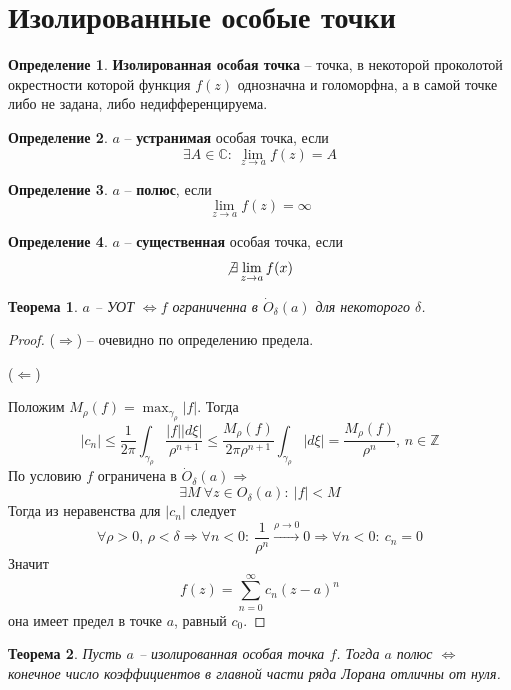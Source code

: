 \documentclass[a4paper,12pt]{article}
\renewcommand{\leq}{\ensuremath{\leqslant}}
\theoremstyle{plain}
\newtheorem{theorem}{Теорема}[section]
\theoremstyle{definition}
\newtheorem{definition}{Определение}[section]
\theoremstyle{remark}
\begin{document}
\section{Изолированные особые точки}
\begin{definition}
	\textbf{Изолированная особая точка} -- точка, в некоторой проколотой окрестности которой функция $f(z)$ однозначна и голоморфна, а в самой точке либо не задана, либо недифференцируема.
\end{definition}

\begin{definition}
	$a$ -- \textbf{устранимая} особая точка, если
	\[
		\exists A \in \mathbb{C} :\: \lim_{z \to a} f(z) = A
	\]
\end{definition}

\begin{definition}
	$a$ -- \textbf{полюс}, если
	\[
		\lim_{z \to a} f(z) = \infty
	\]
\end{definition}

\begin{definition}
	$a$ -- \textbf{существенная} особая точка, если
	\[
		\not\exists \lim_{z \to a}f(x)
	\]
\end{definition}

\begin{theorem}
	$a$ -- УОТ $\Leftrightarrow f$ ограниченна в $\dot{O}_\delta(a)$ для некоторого $\delta$.
\end{theorem}

\begin{proof}
	($\Rightarrow$) -- очевидно по определению предела.

	($\Leftarrow$)

	Положим $M_\rho(f) = \max_{\gamma_\rho}\vert f\vert$. Тогда
	\[
		\vert c_n\vert \leq \frac{1}{2\pi}\int_{\gamma_\rho} \frac{\vert f\vert\vert d\xi\vert}{\rho^{n + 1}} \leq \frac{M_\rho(f)}{2\pi\rho^{n + 1}}\int_{\gamma_\rho}\vert d\xi\vert = \frac{M_\rho(f)}{\rho^n},\, n \in \mathbb{Z}
	\]
	По условию $f$ ограничена в $\dot{O}_\delta(a) \Rightarrow$
	\[
		\exists M \: \forall z \in O_\delta(a) :\: \vert f\vert < M
	\]
	Тогда из неравенства для $\vert c_n\vert$ следует
	\[
		\forall \rho > 0,\, \rho < \delta \Rightarrow \forall n < 0 :\: \frac{1}{\rho^n} \overset{\rho \to 0}{\to} 0 \Rightarrow \forall n < 0 :\: c_n = 0
	\]
	Значит
	\[
		f(z) = \sum_{n = 0}^\infty c_n(z - a)^n
	\]
	она имеет предел в точке $a$, равный $c_0$.
\end{proof}

\begin{theorem}
	Пусть $a$ -- изолированная особая точка $f$. Тогда $a$ полюс $\Leftrightarrow$ конечное число коэффициентов в главной части ряда Лорана отличны от нуля.
\end{theorem}
\end{document}
